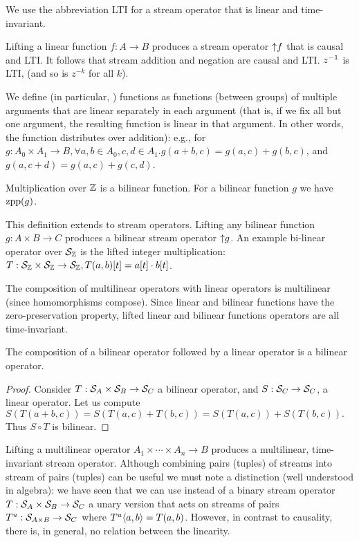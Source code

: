 We use the abbreviation LTI for a stream operator that is linear and time-invariant.

Lifting a linear function $f: A \to B$ produces a stream operator ${\uparrow}f$ that is causal and LTI.
It follows that stream addition and negation are causal and LTI.
$z^{-1}$ is LTI, (and so is $z^{-k}$ for all $k$).

\begin{definition}
We define  (in particular, ) functions as functions (between groups) of multiple
arguments that are linear separately in each argument (that is, if we fix all but one argument,
the resulting function is linear in that argument.  In other words, the function distributes over addition):
e.g., for $g: A_0 \times A_1 \to B, \forall a, b \in A_0, c, d \in A_1 . g(a+b, c) = g(a, c) + g(b, c)$,
and $g(a, c+d) = g(a, c) + g(c, d)$.
\end{definition}

Multiplication over $\mathbb{Z}$ is a bilinear function.  For a bilinear function $g$ we have $\mbox{zpp}(g)$.

This definition extends to stream operators.
Lifting any bilinear function $g: A \times B \to C$ produces a bilinear stream operator ${\uparrow}g$.
An example bi-linear operator over $\mathcal{S}_{\mathbb{Z}}$ is the lifted integer multiplication:
$T: \mathcal{S}_{\mathbb{Z}} \times \mathcal{S}_{\mathbb{Z}} \to \mathcal{S}_{\mathbb{Z}}, T(a, b)[t] = a[t]\cdot b[t]$.

The composition of multilinear operators with linear operators is multilinear (since homomorphisms compose).
Since linear and bilinear functions have the zero-preservation property,
lifted linear and bilinear functions operators are all time-invariant.

\begin{proposition}
The composition of a bilinear operator followed by a linear operator is a bilinear operator.
\end{proposition}
\begin{proof}
Consider $T: \mathcal{S}_{A} \times \mathcal{S}_{B} \to \mathcal{S}_{C}$ a bilinear operator, and
$S: \mathcal{S}_{C} \to \mathcal{S}_{C}$, a linear operator.  Let us compute $S(T(a+b, c)) = S(T(a, c) + T(b, c)) =
S(T(a, c)) + S(T(b, c)).$  Thus $S \circ T$ is bilinear.
\end{proof}

Lifting a multilinear operator $A_1\times\cdots\times A_n \rightarrow B$ produces a multilinear, time-invariant stream operator. Although combining pairs (tuples) of
streams into stream of pairs (tuples) can be useful
we must note a distinction (well understood in algebra):
we have seen that we can use instead of a binary stream operator
$T:\mathcal{S}_{A}\times\mathcal{S}_{B}\to\mathcal{S}_{C}$ a unary version that acts on streams of pairs
$T^u:\mathcal{S}_{A\times B}\to\mathcal{S}_{C}$ where $T^u\langle a,b \rangle=T(a,b)$. However, in contrast to causality,
there is, in general, no relation between the linearity. %

